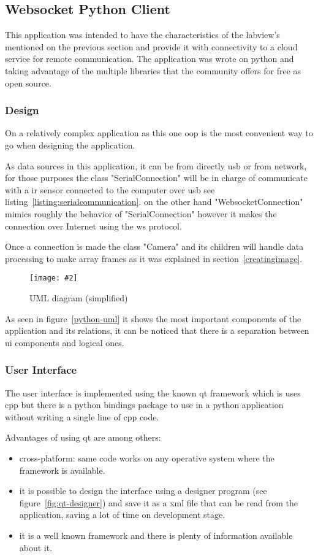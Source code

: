 \documentclass[hidelinks,11pt,a4paper,oneside,article]{memoir}
\newcommand{\putimage}[3][10] %
{
\begin{figure}[h]
	\centering
	\captionsetup{justification=centering}
	\texttt{[image: \#2]}
	\caption{#3}
	\label{fig:#2}
\end{figure}
}
\begin{document}
\subsection{Websocket Python Client}\label{sec:websocket-python-client}
This application was intended to have the characteristics of the \gls{labview}'s mentioned on the previous section and provide it with connectivity to a cloud service for remote communication. The application was wrote on python and taking advantage of the multiple libraries that the community offers for free as open source. %


\subsubsection{Design}
On a relatively complex application as this one  \gls{oop} is the most convenient way to go when designing the application.

As data sources in this application, it can be from directly \gls{usb} or from network, for those purposes the class "SerialConnection" will be in charge of communicate with a \gls{ir} sensor connected to the computer over \gls{usb} see listing~\ref{listing:serialcommunication}. on the other hand "WebsocketConnection" mimics roughly the behavior of "SerialConnection" however it makes the connection over Internet using the \gls{ws} protocol.

Once a connection is made the class "Camera" and its children will handle data processing to make array frames as it was explained in section~\ref{creatingimage}.

    \putimage[15]{python-uml}{UML diagram (simplified)}
    
As seen in figure~\ref{python-uml} it shows the most important components of the application and its relations, it can be noticed that there is a separation between \gls{ui} components and logical ones.

\subsubsection{User Interface}
The user interface is implemented using the known \gls{qt} framework which is uses \gls{cpp} but there is a python bindings package to use in a python application without writing a single line of \gls{cpp} code. %

Advantages of using qt are among others:
\begin{itemize}
    \item cross-platform: same code works on any operative system where the framework is available.
    \item it is possible to design the interface using a designer program (see figure~\ref{fig:qt-designer}) and save it as a \gls{xml} file that can be read from the application, saving a lot of time on development stage.
    \item it is a well known framework and there is plenty of information available about it.
\end{itemize}
\end{document}
